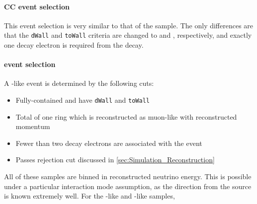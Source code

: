 

\paragraph{CC\quickmath{1\pi^{+}} event selection} This event selection is very similar to that of the  sample. The only differences are that the \texttt{dWall} and \texttt{toWall} criteria are changed to  and , respectively, and exactly one decay electron is required from the \quickmath{\pi^{+}} decay. 

\paragraph{ event selection}

A -like event is determined by the following cuts:

\begin{itemize}
\item Fully-contained and have \texttt{dWall}  and \texttt{toWall} 
\item Total of one ring which is reconstructed as muon-like with reconstructed momentum 
\item Fewer than two decay electrons are associated with the event
\item Passes \quickmath{\pi^{+}} rejection cut discussed in \autoref{sec:Simulation_Reconstruction}
\end{itemize}


All of these samples are binned in reconstructed neutrino energy. This is possible under a particular interaction mode assumption, as the direction from the source is known extremely well. For the -like and -like samples,

